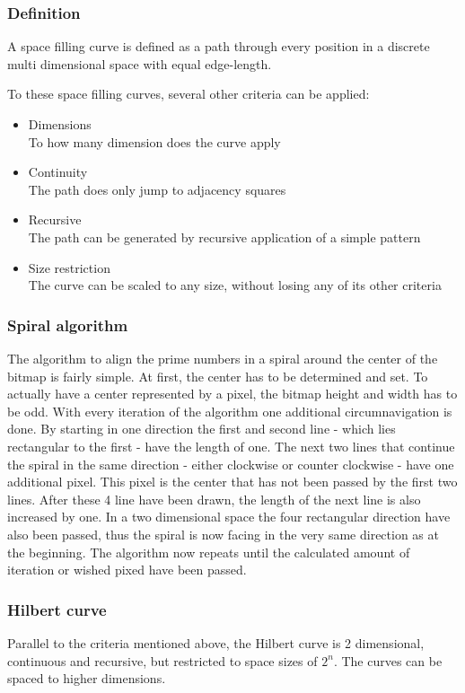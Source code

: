 \subsubsection{Definition}
A space filling curve is defined as a path through every position in a discrete multi dimensional space with equal edge-length.%

To these space filling curves, several other criteria can be applied:
\begin{itemize}%
   \item Dimensions\\
      To how many dimension does the curve apply
   \item Continuity\\
      The path does only jump to adjacency squares
   \item Recursive\\
      The path can be generated by recursive application of a simple pattern
   \item Size restriction\\
      The curve can be scaled to any size, without losing any of its other criteria
\end{itemize}%

\subsubsection{Spiral algorithm}
The algorithm to align the prime numbers in a spiral around the center of the bitmap is fairly simple. At first, the center has to be determined and set. To actually have a center represented by a pixel, the bitmap height and width has to be odd. With every iteration of the algorithm one additional circumnavigation is done. By starting in one direction the first and second line - which lies rectangular to the first - have the length of one. The next two lines that continue the spiral in the same direction - either clockwise or counter clockwise - have one additional pixel. This pixel is the center that has not been passed by the first two lines. After these 4 line have been drawn, the length of the next line is also increased by one. In a two dimensional space the four rectangular direction have also been passed, thus the spiral is now facing in the very same direction as at the beginning. The algorithm now repeats until the calculated amount of iteration or wished pixed have been passed.

\subsubsection{Hilbert curve}
Parallel to the criteria mentioned above, the Hilbert curve is 2 dimensional, continuous and recursive, but restricted to space sizes of $2^{n}$. The curves can be spaced to higher dimensions.

